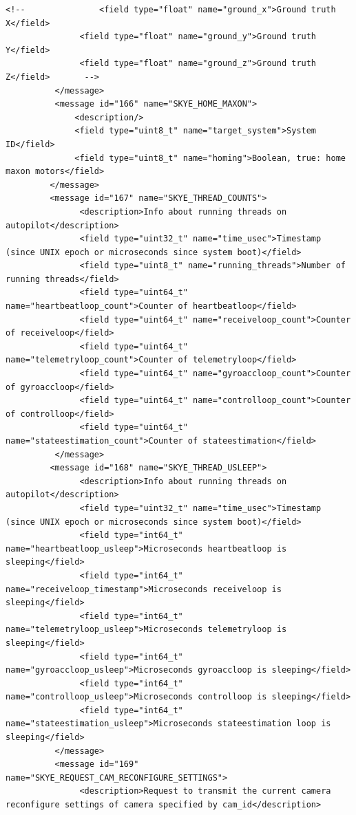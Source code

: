 \begin{lstlisting}[captionpos=b, caption="Definition of \textsc{Skye} specific Mavlink messages", label=app_xml]
               <!--               <field type="float" name="ground_x">Ground truth X</field>			
               <field type="float" name="ground_y">Ground truth Y</field>
               <field type="float" name="ground_z">Ground truth Z</field>		-->
          </message>
          <message id="166" name="SKYE_HOME_MAXON">
              <description/>
              <field type="uint8_t" name="target_system">System ID</field>
              <field type="uint8_t" name="homing">Boolean, true: home maxon motors</field>
         </message>
         <message id="167" name="SKYE_THREAD_COUNTS">
               <description>Info about running threads on autopilot</description>
               <field type="uint32_t" name="time_usec">Timestamp (since UNIX epoch or microseconds since system boot)</field>
               <field type="uint8_t" name="running_threads">Number of running threads</field>
               <field type="uint64_t" name="heartbeatloop_count">Counter of heartbeatloop</field>
               <field type="uint64_t" name="receiveloop_count">Counter of receiveloop</field>
               <field type="uint64_t" name="telemetryloop_count">Counter of telemetryloop</field>
               <field type="uint64_t" name="gyroaccloop_count">Counter of gyroaccloop</field>
               <field type="uint64_t" name="controlloop_count">Counter of controlloop</field>
               <field type="uint64_t" name="stateestimation_count">Counter of stateestimation</field>
          </message>
         <message id="168" name="SKYE_THREAD_USLEEP">
               <description>Info about running threads on autopilot</description>
               <field type="uint32_t" name="time_usec">Timestamp (since UNIX epoch or microseconds since system boot)</field>
               <field type="int64_t" name="heartbeatloop_usleep">Microseconds heartbeatloop is sleeping</field>
               <field type="int64_t" name="receiveloop_timestamp">Microseconds receiveloop is sleeping</field>
               <field type="int64_t" name="telemetryloop_usleep">Microseconds telemetryloop is sleeping</field>
               <field type="int64_t" name="gyroaccloop_usleep">Microseconds gyroaccloop is sleeping</field>
               <field type="int64_t" name="controlloop_usleep">Microseconds controlloop is sleeping</field>
               <field type="int64_t" name="stateestimation_usleep">Microseconds stateestimation loop is sleeping</field>
          </message>
          <message id="169" name="SKYE_REQUEST_CAM_RECONFIGURE_SETTINGS">
               <description>Request to transmit the current camera reconfigure settings of camera specified by cam_id</description>

\end{lstlisting}
